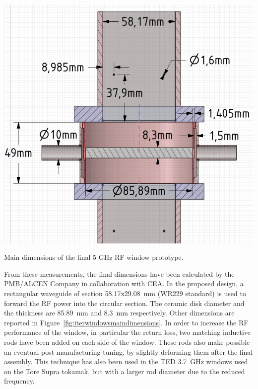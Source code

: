 {\begin{marginfigure}[-3cm]
	\centering
	\includegraphics[width=1.0\linewidth]{figures/chap3/ITER_window/ITER_windows_main_dimensions}
	\caption{Main dimensions of the final 5 GHz RF window prototype. }
	\label{fig:iterwindowsmaindimensions}
\end{marginfigure}

From these measurements, the final dimensions have been calculated by the PMB/ALCEN Company in collaboration with CEA. In the proposed design, a rectangular waveguide of section 58.17x29.08~\si{mm} (WR229 standard) is used to forward the RF power into the circular section. The ceramic disk diameter and the thickness are 85.89~mm and 8.3~mm respectively. Other dimensions are reported in Figure~\ref{fig:iterwindowsmaindimensions}. In order to increase the RF performance of the window, in particular the return loss, two matching inductive rods have been added on each side of the window. These rods also make possible an eventual post-manufacturing tuning, by slightly deforming them after the final assembly. This technique has also been used in the TED 3.7~GHz windows used on the Tore Supra tokamak, but with a larger rod diameter due to the reduced frequency. 

}
